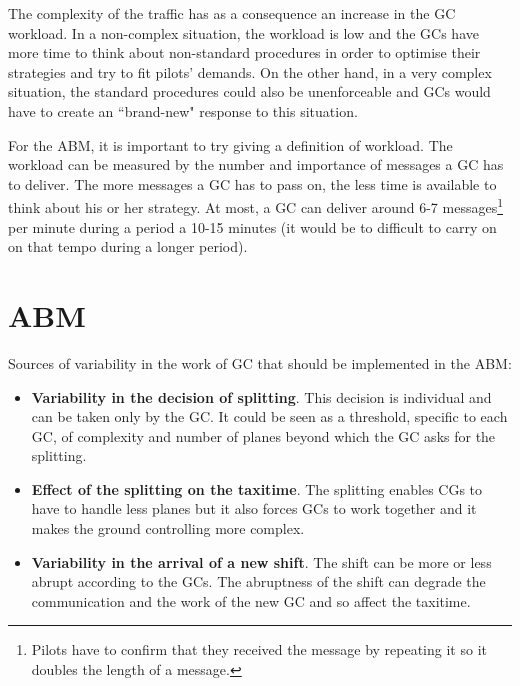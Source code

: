\documentclass{article}
\begin{document}
The complexity of the traffic has as a consequence an increase in the GC workload. 
In a non-complex situation, the workload is low and the GCs have more time to think about non-standard procedures in order to optimise their strategies and try to fit pilots' demands.
On the other hand, in a very complex situation, the standard procedures could also be unenforceable and GCs would have to create an ``brand-new" response to this situation.

For the ABM, it is important to try giving a definition of workload. The workload can be measured by the number and importance of messages a GC has to deliver. The more messages a GC has to pass on, the less time is available to think about his or her strategy. At most, a GC can deliver around 6-7 messages\footnote{Pilots have to confirm that they received the message by repeating it so it doubles the length of a message.} per minute during a period a 10-15 minutes (it would be to difficult to carry on on that tempo during a longer period). 


\section{ABM}
Sources of variability in the work of GC that should be implemented in the ABM:
\begin{itemize}
	\item \textbf{Variability in the decision of splitting}. This decision is individual and can be taken only by the GC. It could be seen as a threshold, specific to each GC, of complexity and number of planes beyond which the GC asks for the splitting.
	\item \textbf{Effect of the splitting on the taxitime}. The splitting enables CGs to have to handle less planes but it also forces GCs to work together and it makes the ground controlling more complex.
	\item \textbf{Variability in the arrival of a new shift}. The shift can be more or less abrupt according to the GCs. The abruptness of the shift can degrade the communication and the work of the new GC and so affect the taxitime.
\end{itemize}
\end{document}
